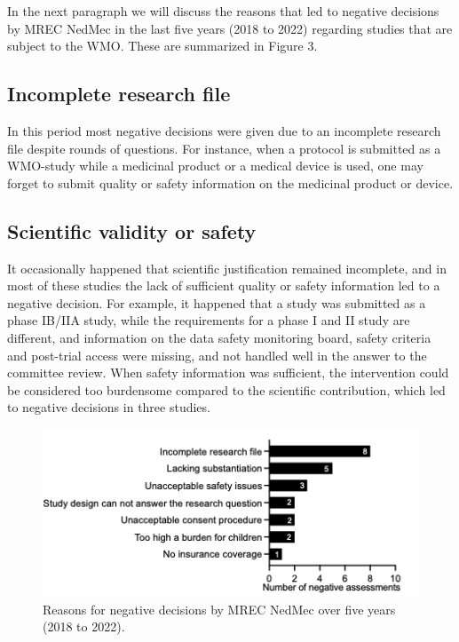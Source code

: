 \documentclass[authordate, empirical]{jote-new-article}
\begin{document}
	In the next paragraph we will discuss the reasons that led to negative decisions by MREC NedMec in the last five years (2018 to 2022) regarding studies that are subject to the WMO. These are summarized in Figure 3.







	\subsection{Incomplete research file}



	In this period most negative decisions were given due to an incomplete research file despite rounds of questions. For instance, when a protocol is submitted as a WMO-study while a medicinal product or a medical device is used, one may forget to submit quality or safety information on the medicinal product or device.







	\subsection{Scientific validity or safety}



	It occasionally happened that scientific justification remained incomplete, and in most of these studies the lack of sufficient quality or safety information led to a negative decision. For example, it happened that a study was submitted as a phase IB/IIA study, while the requirements for a phase I and II study are different, and information on the data safety monitoring board, safety criteria and post-trial access were missing, and not handled well in the answer to the committee review. When safety information was sufficient, the intervention could be considered too burdensome compared to the scientific contribution, which led to negative decisions in three studies.




	\begin{figure}
		\begin{fullwidth}
			\includegraphics[width=\linewidth]{media/Picture3.png}
	
			\caption{Reasons for negative decisions by MREC NedMec over five years (2018 to 2022).}
	
			\label{fig:rId13}
	
		\end{fullwidth}
		\end{figure}
\end{document}
